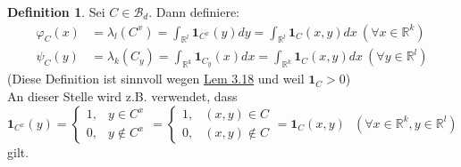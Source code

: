 \documentclass[a4paper]{scrreprt}
\newcommand{\doubleOne}{\textbf{1}}
\newcommand{\R}{\mathbb{R}}
\newcommand{\Borel}{\mathcal{B}}
\newcommand{\Bd}{\Borel_d}
\newcommand{\jlabel}[1]{\label{j_#1}}
\newcommand{\jhyperref}[2]{\hyperref[j_#1]{#2}}
\newcommand{\jlink}[1]{\jhyperref{#1}{#1}}
\theoremstyle{plain}
\theoremstyle{definition}
\newtheorem*{defn*}{Definition}
\begin{document}
{{{{\begin{defn*}
    Sei $C\in \Bd$. Dann definiere:
    \jlabel{(3.4)}
    \begin{equation}
        \begin{split}
            \varphi_C(x) &= \lambda_l(C^x) = \int_{\R^l} \doubleOne_{C^x}(y) dy = \int_{\R^l} \doubleOne_C (x,y) dx \ (\forall x\in \R^k)\\
            \psi_C(y) &= \lambda_k(C_y) = \int_{\R^k} \doubleOne_{C_y} (x) dx = \int_{\R^k} \doubleOne_C(x,y)dx \ (\forall y \in \R^l)
        \end{split}
    \end{equation}
    (Diese Definition ist sinnvoll wegen \jlink{Lem 3.18} und weil $\doubleOne_{C} > 0$)\\
    An dieser Stelle wird z.B. verwendet, dass
    \begin{displaymath}
        \doubleOne_{C^x}(y) = \begin{cases} 1, &y\in C^x\\ 0, &y\notin C^x \end{cases} = \begin{cases} 1, &(x,y)\in C\\ 0, &(x,y)\notin C \end{cases} = \doubleOne_C(x,y) \ \ \ (\forall x\in\R^k, y\in\R^l)
    \end{displaymath}
    gilt.
\end{defn*}

}}}}
\end{document}

